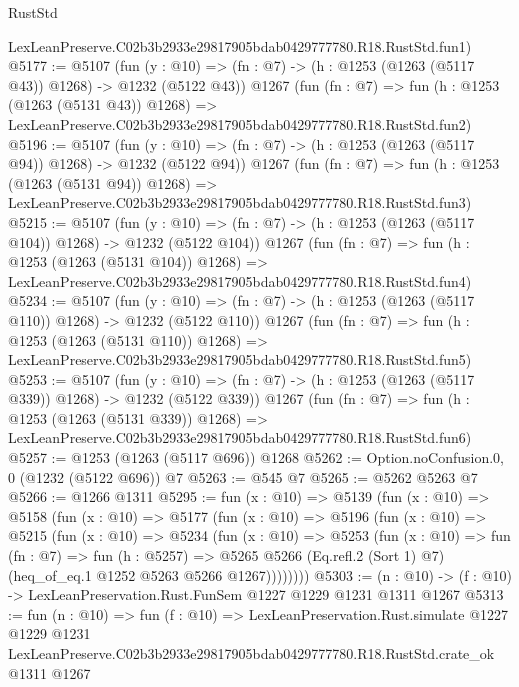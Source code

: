 \begin{lexlean}{RustStd}
\begin{coremodule}
    LexLeanPreserve.C02b3b2933e29817905bdab0429777780.R18.RustStd.fun1)
@5177 := @5107
    (fun (y : @10) => (fn : @7) -> (h : @1253 (@1263 (@5117 @43)) @1268) -> @1232 (@5122 @43))
    @1267
    (fun (fn : @7) =>
    fun (h : @1253 (@1263 (@5131 @43)) @1268) =>
    LexLeanPreserve.C02b3b2933e29817905bdab0429777780.R18.RustStd.fun2)
@5196 := @5107
    (fun (y : @10) => (fn : @7) -> (h : @1253 (@1263 (@5117 @94)) @1268) -> @1232 (@5122 @94))
    @1267
    (fun (fn : @7) =>
    fun (h : @1253 (@1263 (@5131 @94)) @1268) =>
    LexLeanPreserve.C02b3b2933e29817905bdab0429777780.R18.RustStd.fun3)
@5215 := @5107
    (fun (y : @10) => (fn : @7) -> (h : @1253 (@1263 (@5117 @104)) @1268) -> @1232 (@5122 @104))
    @1267
    (fun (fn : @7) =>
    fun (h : @1253 (@1263 (@5131 @104)) @1268) =>
    LexLeanPreserve.C02b3b2933e29817905bdab0429777780.R18.RustStd.fun4)
@5234 := @5107
    (fun (y : @10) => (fn : @7) -> (h : @1253 (@1263 (@5117 @110)) @1268) -> @1232 (@5122 @110))
    @1267
    (fun (fn : @7) =>
    fun (h : @1253 (@1263 (@5131 @110)) @1268) =>
    LexLeanPreserve.C02b3b2933e29817905bdab0429777780.R18.RustStd.fun5)
@5253 := @5107
    (fun (y : @10) => (fn : @7) -> (h : @1253 (@1263 (@5117 @339)) @1268) -> @1232 (@5122 @339))
    @1267
    (fun (fn : @7) =>
    fun (h : @1253 (@1263 (@5131 @339)) @1268) =>
    LexLeanPreserve.C02b3b2933e29817905bdab0429777780.R18.RustStd.fun6)
@5257 := @1253 (@1263 (@5117 @696)) @1268
@5262 := Option.noConfusion.{0, 0} (@1232 (@5122 @696)) @7
@5263 := @545 @7
@5265 := @5262 @5263 @7
@5266 := @1266 @1311
@5295 := fun (x : @10) =>
  @5139
    (fun (x : @10) =>
    @5158
      (fun (x : @10) =>
      @5177
        (fun (x : @10) =>
        @5196
          (fun (x : @10) =>
          @5215
            (fun (x : @10) =>
            @5234
              (fun (x : @10) =>
              @5253
                (fun (x : @10) =>
                fun (fn : @7) =>
                fun (h : @5257) =>
                @5265 @5266 (Eq.refl.{2} (Sort 1) @7) (heq_of_eq.{1} @1252 @5263 @5266 @1267))))))))
@5303 := (n : @10) -> (f : @10) -> LexLeanPreservation.Rust.FunSem @1227 @1229 @1231 @1311 @1267
@5313 := fun (n : @10) =>
  fun (f : @10) =>
  LexLeanPreservation.Rust.simulate
    @1227
    @1229
    @1231
    LexLeanPreserve.C02b3b2933e29817905bdab0429777780.R18.RustStd.crate_ok
    @1311
    @1267
\end{coremodule}
\end{lexlean}
